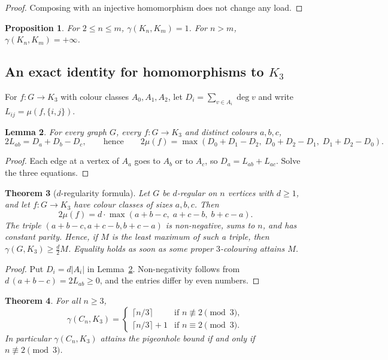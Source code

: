 \documentclass{article}
\newtheorem{theorem}{Theorem}[section]
\newtheorem{proposition}[theorem]{Proposition}
\newtheorem{lemma}[theorem]{Lemma}
\theoremstyle{definition}
\begin{document}
\begin{proof}
Composing with an injective homomorphism does not change any load.
\end{proof}

\begin{proposition}
\label{prop:gamma_Kn}
For $2\le n\le m$, $\gamma(K_n,K_m)=1$.  For $n>m$, $\gamma(K_n,K_m)=+\infty$.
\end{proposition}

\subsection{An exact identity for homomorphisms to $K_3$}

For $f\colon G\to K_3$ with colour classes $A_0,A_1,A_2$, let
$D_i=\sum_{v\in A_i}\deg v$ and write $L_{ij}=\mu(f,\{i,j\})$.

\begin{lemma}
\label{lem:degree_identity}
For every graph $G$, every $f\colon G\to K_3$ and distinct colours $a,b,c$,
\[
  2L_{ab}=D_a+D_b-D_c,
  \qquad\text{hence}\qquad
  2\mu(f)=\max(D_0+D_1-D_2,\;D_0+D_2-D_1,\;D_1+D_2-D_0).
\]
\end{lemma}

\begin{proof}
Each edge at a vertex of $A_a$ goes to $A_b$ or to $A_c$, so $D_a=L_{ab}+L_{ac}$.
Solve the three equations.
\end{proof}

\begin{theorem}[$d$-regularity formula]
\label{thm:d_regular}
Let $G$ be $d$-regular on $n$ vertices with $d\ge1$, and let $f\colon G\to K_3$
have colour classes of sizes $a,b,c$.  Then
\[
  2\mu(f) = d\cdot\max(a+b-c,\; a+c-b,\; b+c-a).
\]
The triple $(a+b-c,a+c-b,b+c-a)$ is non-negative, sums to $n$, and has constant
parity.  Hence, if $M$ is the least maximum of such a triple, then
$\gamma(G,K_3)\ge\frac d2M$.  Equality holds as soon as some proper $3$-colouring
attains $M$.
\end{theorem}

\begin{proof}
Put $D_i=d|A_i|$ in Lemma~\ref{lem:degree_identity}.  Non-negativity follows from
$d\,(a+b-c)=2L_{ab}\ge0$, and the entries differ by even numbers.
\end{proof}

\begin{theorem}
\label{thm:cycle_gamma}
For all $n\ge3$,
\[
  \gamma(C_n, K_3) =
  \begin{cases}
    \lceil n/3 \rceil     & \text{if } n \not\equiv 2 \pmod{3}, \\
    \lceil n/3 \rceil + 1 & \text{if } n \equiv 2 \pmod{3}.
  \end{cases}
\]
In particular $\gamma(C_n,K_3)$ attains the pigeonhole bound if and only if
$n\not\equiv2\pmod 3$.
\end{theorem}
\end{document}
